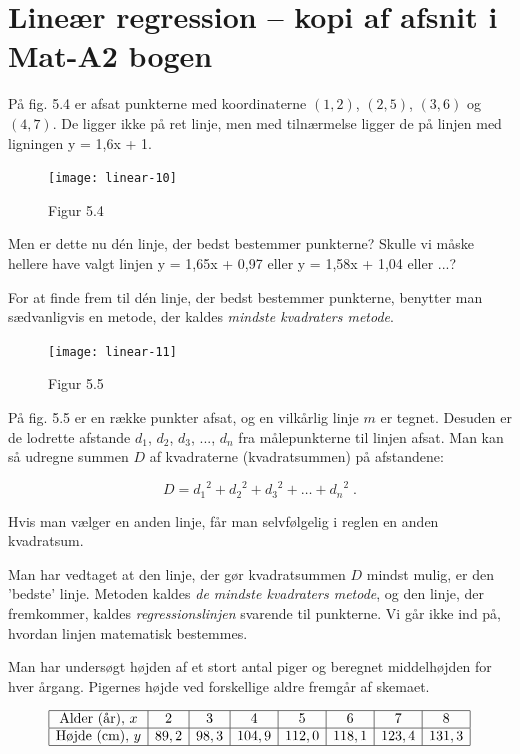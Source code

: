 \documentclass[12pt,oneside,a4paper]{article}
\begin{document}
\section{Lineær regression -- kopi af afsnit i Mat-A2 bogen}
På fig. 5.4 er afsat punkterne med koordinaterne $(1, 2)$, $(2, 5)$, $(3, 6)$ og $(4,
7)$. De ligger ikke på ret linje, men med tilnærmelse ligger de på linjen med
ligningen y = 1,6x + 1.

\begin{figure}[ht]
    \centering
    \texttt{[image: linear-10]}
    \caption{Figur 5.4}
    \label{fig54}
\end{figure}

Men er dette nu dén linje, der bedst bestemmer punkterne? Skulle vi måske
hellere have valgt linjen y = 1,65x + 0,97 eller y = 1,58x + 1,04 eller ...?

For at finde frem til dén linje, der bedst bestemmer punkterne, benytter man
sædvanligvis en metode, der kaldes {\em mindste kvadraters metode}.

\begin{figure}[ht]
    \centering
    \texttt{[image: linear-11]}
    \caption{Figur 5.5}
    \label{fig55}
\end{figure}

På fig. 5.5 er en række punkter afsat, og en vilkårlig linje $m$ er tegnet. Desuden er de
lodrette afstande $d_1$, $d_2$, $d_3$, ..., $d_n$ fra målepunkterne til linjen afsat. Man
kan så udregne summen $D$ af kvadraterne (kvadratsummen) på afstandene:

$$
D = {d_1}^2 + {d_2}^2 + {d_3}^2 + \ldots + {d_n}^2 \; . 
$$

Hvis man vælger en anden linje, får man selvfølgelig i reglen en anden kvadratsum.

Man har vedtaget at den linje, der gør kvadratsummen $D$ mindst mulig, er den
'bedste' linje. Metoden kaldes {\em de mindste kvadraters metode}, og den linje, der
fremkommer, kaldes {\em regressionslinjen} svarende til punkterne. Vi går ikke ind
på, hvordan linjen matematisk bestemmes. 


Man har undersøgt højden af et stort antal piger og beregnet middel\-høj\-den for
hver årgang. Pigernes højde ved forskellige aldre fremgår af skemaet.

$$
\begin{array}{|c|c|c|c|c|c|c|c|}
    \hline
    \mbox{Alder (år)},\, x &  2 &  3 &  4 &  5 &  6 &  7 &  8 \\
    \hline
    \mbox{Højde (cm)},\, y &  89,2 &   98,3 &   104,9 &  112,0 &  118,1 &  123,4 &  131,3 \\
    \hline
\end{array}
$$
\end{document}
